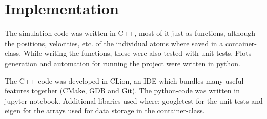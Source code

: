 \chapter{Implementation}
\begin{comment}	
	go about structure of the code 
	-> describe Code structure
		
	-> c++ was used to implement the code (mostly functional)
	-> key atoms container Class which holdes all the Values
	-> most functions were tested with googleTest
\end{comment}

\begin{comment}
code written in c++ most of it pretty functional, classes just used 
for the atoms container which holds the arrays 
while writing it also wrote the unittests with googletest
data aquiered form the code plotted with python
also where large simulations had to be run, called the program from the python code

--
code is structured into the milestones, so an individual milestone can be rerun in case of fuckup
parted into h and cpp files as usual

\end{comment}
The simulation code was written in C++, most of it just as functions, although the positions, velocities, etc. of the individual atoms where saved in a container-class.
While writing the functions, these were also tested with unit-tests.
Plots generation and automation for running the project were written in python.

\begin{comment}
developed in CLion which as an integrated git inviroment
Clion builds with Cmake then clang as a compiler
debugger is gdb(nicely hidden)
- additianal bibs where :
	googletest	for unittests
	eigen		for arrays 
- 
\end{comment}
The C++-code was developed in CLion, an IDE which bundles many useful features together (CMake, GDB and Git).
The python-code was written in jupyter-notebook. 
Additional libaries used where: googletest for the unit-tests and eigen for the arrays used for data storage in the container-class.
